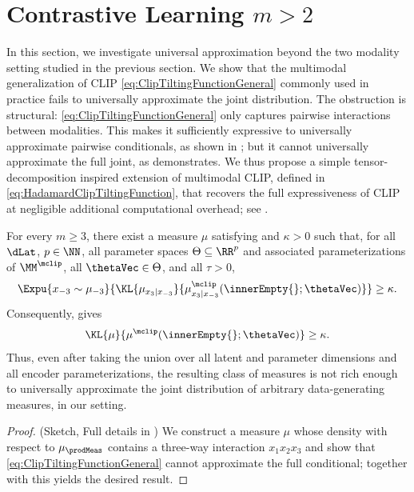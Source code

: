 \documentclass{article}
\begin{document}
\section{Contrastive Learning $m>2$}
\label{sec:ContrastiveLearningBeyondBimodal}
In this section, we investigate universal approximation beyond the two
modality setting studied in the previous section. We show that the
multimodal generalization of CLIP \eqref{eq:ClipTiltingFunctionGeneral}
commonly used in practice fails to universally approximate the joint
distribution. The obstruction is structural:
\eqref{eq:ClipTiltingFunctionGeneral} only captures pairwise
interactions between modalities. This makes it sufficiently expressive to
universally approximate pairwise conditionals, as shown in
; but it cannot
universally approximate the full joint,
as  demonstrates.
We thus propose a simple tensor-decomposition
inspired extension of multimodal CLIP, defined in
\eqref{eq:HadamardClipTiltingFunction}, that recovers the full
expressiveness of CLIP at negligible additional computational overhead;
see .

\begin{theorem}
 \label{thm:noUniversalApproximationClip}
 For every $m\geq3$, there exist a measure $\mu$ satisfying
  and $\kappa>0$ such that, for all
  $\dLat$, $p\in\NN$, all parameter spaces $\Theta\subseteq\RR^p$ and associated
  parameterizations of $\MM^{\mclip}$, all $\thetaVec\in\Theta$, and all
  $\tau>0$,
 \begin{align*}
  \Expu{x_{-3} \sim \mu_{-3}}{\KL{\mu_{x_3\vert x_{-3}}}{\mu^{\mclip}_{
  x_3\vert x_{-3}}(\innerEmpty{};\thetaVec)}} \geq\kappa.
 \end{align*}
 Consequently,  gives
 \begin{align*}
  \KL{\mu}{\mu^{\mclip}(\innerEmpty{};\thetaVec)} \geq\kappa.
 \end{align*}
 Thus, even after taking the union over all latent and parameter dimensions
  and all encoder parameterizations, the resulting class of measures is not
  rich enough to universally approximate the joint distribution of
  arbitrary data-generating measures, in our setting.
\end{theorem}
\begin{proof}
 (Sketch, Full details in )
 We construct a measure $\mu$ whose density with respect to
 $\mu_\prodMeas$ contains a three-way interaction $x_1x_2x_3$ and show that
 \eqref{eq:ClipTiltingFunctionGeneral} cannot approximate the full
 conditional; together with  this yields
 the desired result.
\end{proof}
\end{document}
